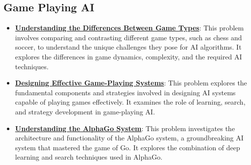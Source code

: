 \documentclass{article}%
\begin{document}
\subsection{Game Playing AI}%
\label{subsec:GamePlayingAI}%
\begin{itemize}[leftmargin=*]%
\item \href{https://purdue.brightspace.com/d2l/common/assets/pdfjs-d2l-dist/1.0.14-legacy/web/viewer.html?file=\%2Fcontent\%2Fenforced\%2F1095467-wl.202510.CS.24300.001\%2F02L2-Intro.pdf\%3Fou\%3D1095467\&lang=en-us\&container=d2l-fileviewer-rendered-pdf\&fullscreen=d2l-fileviewer-rendered-pdf-dialog\&height=667#page=27}{\textbf{Understanding the Differences Between Game Types}}: This problem involves comparing and contrasting different game types, such as chess and soccer, to understand the unique challenges they pose for AI algorithms. It explores the differences in game dynamics, complexity, and the required AI techniques.%
\item \href{https://purdue.brightspace.com/d2l/common/assets/pdfjs-d2l-dist/1.0.14-legacy/web/viewer.html?file=\%2Fcontent\%2Fenforced\%2F1095467-wl.202510.CS.24300.001\%2F02L2-Intro.pdf\%3Fou\%3D1095467\&lang=en-us\&container=d2l-fileviewer-rendered-pdf\&fullscreen=d2l-fileviewer-rendered-pdf-dialog\&height=667#page=47}{\textbf{Designing Effective Game{-}Playing Systems}}: This problem explores the fundamental components and strategies involved in designing AI systems capable of playing games effectively. It examines the role of learning, search, and strategy development in game{-}playing AI.%
\item \href{https://purdue.brightspace.com/d2l/common/assets/pdfjs-d2l-dist/1.0.14-legacy/web/viewer.html?file=\%2Fcontent\%2Fenforced\%2F1095467-wl.202510.CS.24300.001\%2F02L2-Intro.pdf\%3Fou\%3D1095467\&lang=en-us\&container=d2l-fileviewer-rendered-pdf\&fullscreen=d2l-fileviewer-rendered-pdf-dialog\&height=667#page=50}{\textbf{Understanding the AlphaGo System}}: This problem investigates the architecture and functionality of the AlphaGo system, a groundbreaking AI system that mastered the game of Go. It explores the combination of deep learning and search techniques used in AlphaGo.%
\end{itemize}

%
\end{document}
